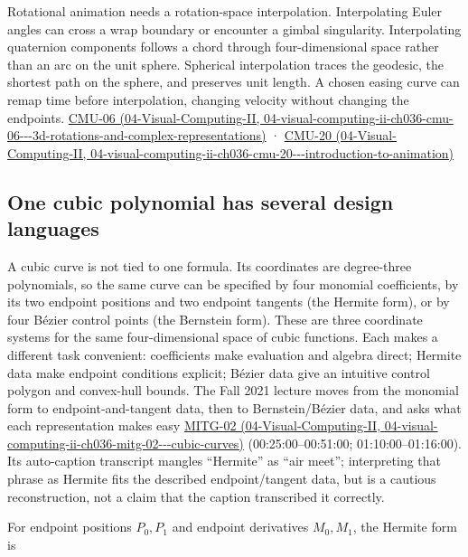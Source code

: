 Rotational animation needs a rotation-space interpolation. Interpolating Euler angles can cross a wrap boundary or encounter a gimbal singularity. Interpolating quaternion components follows a chord through four-dimensional space rather than an arc on the unit sphere. Spherical interpolation traces the geodesic, the shortest path on the sphere, and preserves unit length. A chosen easing curve can remap time before interpolation, changing velocity without changing the endpoints. \href{../04-Visual-Computing-II/main.pdf\#nameddest=04-visual-computing-ii-ch036-cmu-06---3d-rotations-and-complex-representations}{CMU-06 (04-Visual-Computing-II, 04-visual-computing-ii-ch036-cmu-06-\/-\/-3d-rotations-and-complex-representations)} · \href{../04-Visual-Computing-II/main.pdf\#nameddest=04-visual-computing-ii-ch036-cmu-20---introduction-to-animation}{CMU-20 (04-Visual-Computing-II, 04-visual-computing-ii-ch036-cmu-20-\/-\/-introduction-to-animation)}

\subsection{One cubic polynomial has several design languages}\label{03-visual-computing-i-ch001-one-cubic-polynomial-has-several-design-languages}

A cubic curve is not tied to one formula. Its coordinates are degree-three polynomials, so the same curve can be specified by four monomial coefficients, by its two endpoint positions and two endpoint tangents (the Hermite form), or by four Bézier control points (the Bernstein form). These are three coordinate systems for the same four-dimensional space of cubic functions. Each makes a different task convenient: coefficients make evaluation and algebra direct; Hermite data make endpoint conditions explicit; Bézier data give an intuitive control polygon and convex-hull bounds. The Fall 2021 lecture moves from the monomial form to endpoint-and-tangent data, then to Bernstein/Bézier data, and asks what each representation makes easy \href{../04-Visual-Computing-II/main.pdf\#nameddest=04-visual-computing-ii-ch036-mitg-02---cubic-curves}{MITG-02 (04-Visual-Computing-II, 04-visual-computing-ii-ch036-mitg-02-\/-\/-cubic-curves)} (00:25:00--00:51:00; 01:10:00--01:16:00). Its auto-caption transcript mangles ``Hermite'' as ``air meet''; interpreting that phrase as Hermite fits the described endpoint/tangent data, but is a cautious reconstruction, not a claim that the caption transcribed it correctly.

For endpoint positions \(P_0,P_1\) and endpoint derivatives \(M_0,M_1\), the Hermite form is


